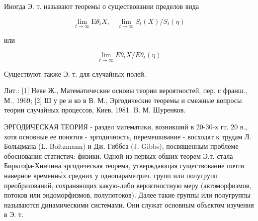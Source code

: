 \documentclass[10pt]{article}
\begin{document}
Иногда Э. т. называют теоремы о существовании пределов вида



\[

\lim _{t \rightarrow \infty} \mathrm{E} \theta_{t} X, \quad \lim _{t \rightarrow \infty} S_{t}(X) / S_{t}(\eta)

\]



или



\[

\lim _{t \rightarrow \infty} E \theta_{t} X / E \theta_{t}(\eta)

\]



Существуют также Э. т. для случайных полей.



Лит.: [1] Неве Ж., Математические основы теории вероятностей, пер. с франш., М., 1969; [2] Ш у ре н ко в В. М., Эргодические теоремы и смежные вопросы теории случайных процессов, Киев, 1981. B. М. Шуренков.



ЭРГОДИЧЕСКАЯ ТЕОРИЯ - раздел математики, возникший в 20-30-х гт. 20 в., хотя основные ее понятия - эргодичность, перемешивание - восходят к трудам Л. Больцмана (L. Boltzmann) и Дж. Гиббса (J. Gibbs), посвященным проблеме обоснования статистич: физики. Одной из первых обших теорем Э.т. стала Биркгофа-Хинчина эргодическая теорема, утверждающая существование почти наверное временны́х средних у однопараметрич. групп или полугрупп преобразований, сохраняющих какую-либо вероятностную меру (автоморфизмов, потоков или эндоморфизмов, полупотоков). Далее такие группы или полугруппы называются динамическими системами. Они служат основным объектом изучения в Э. т.
\end{document}
